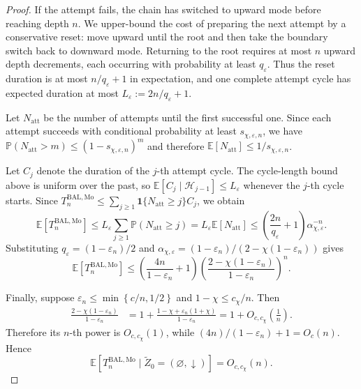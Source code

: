 \documentclass[10pt,a4paper]{amsart}
\newcommand{\bbE}{\mathbb{E}}
\newcommand{\bbP}{\mathbb{P}}
\newcommand{\calH}{{\mathcal{H}}}
\newcommand{\lbra}[1]{\left[#1\right]}
\newcommand{\mbra}[1]{\left\{#1\right\}}
\newcommand{\sbra}[1]{\left(#1\right)}
\begin{document}
\begin{proof}
If the attempt fails, the chain has switched to upward mode before reaching
depth $n$. We upper-bound the cost of preparing the next attempt by a
conservative reset: move upward until the root and then take the boundary
switch back to downward mode. Returning to the root requires at most $n$
upward depth decrements, each occurring with probability at least
$q_\varepsilon$. Thus the reset duration is at most $n/q_\varepsilon+1$
in expectation, and one complete attempt cycle has expected duration at most
$L_\varepsilon:=2n/q_\varepsilon+1$.

Let $N_{\mathrm{att}}$ be the number of attempts until the first successful
one. Since each attempt succeeds with conditional probability at least
$s_{\chi,\varepsilon,n}$, we have
$\bbP(N_{\mathrm{att}}>m)\le(1-s_{\chi,\varepsilon,n})^m$ and therefore
$\bbE[N_{\mathrm{att}}]\le 1/s_{\chi,\varepsilon,n}$.

Let $C_j$ denote the duration of the $j$-th attempt cycle. The cycle-length
bound above is uniform over the past, so
$\bbE[C_j\mid \calH_{j-1}]\le L_\varepsilon$ whenever the $j$-th cycle
starts. Since
$T_n^{\mathrm{BAL,Mo}}\le
\sum_{j\ge1}\mathbf 1\{N_{\mathrm{att}}\ge j\}C_j$,
we obtain
\begin{equation*}
    \bbE[T_n^{\mathrm{BAL,Mo}}]
    \le
    L_\varepsilon\sum_{j\ge1}\bbP(N_{\mathrm{att}}\ge j)
    =
    L_\varepsilon\bbE[N_{\mathrm{att}}]
    \le
    \left(\frac{2n}{q_\varepsilon}+1\right)
    \alpha_{\chi,\varepsilon}^{-n}.
\end{equation*}
Substituting $q_\varepsilon=(1-\varepsilon_n)/2$ and
$\alpha_{\chi,\varepsilon}=(1-\varepsilon_n)/(2-\chi(1-\varepsilon_n))$
gives
\begin{equation*}
    \bbE[T_n^{\mathrm{BAL,Mo}}]
    \le
    \sbra{
        \frac{4n}{1-\varepsilon_n}+1
    }
    \sbra{
        \frac{2-\chi(1-\varepsilon_n)}
             {1-\varepsilon_n}
    }^n .
\end{equation*}

Finally, suppose $\varepsilon_n\le \min\mbra{c/n,1/2}$ and
$1-\chi\le c_\chi/n$. Then
\begin{align*}
    \frac{2-\chi(1-\varepsilon_n)}
         {1-\varepsilon_n}
    &=
    1+
    \frac{
        1-\chi+\varepsilon_n(1+\chi)
    }{
        1-\varepsilon_n
    }=
    1+O_{c,c_\chi}\!\left(\frac1n\right).
\end{align*}
Therefore its $n$-th power is $O_{c,c_\chi}(1)$, while
$(4n)/(1-\varepsilon_n)+1=O_c(n)$. Hence
\begin{equation*}
    \bbE\lbra{
        T_n^{\mathrm{BAL,Mo}}
        \mid
        \widetilde Z_0=(\varnothing,\downarrow)
    }
    =
    O_{c,c_\chi}(n).
\end{equation*}
\end{proof}
\end{document}
